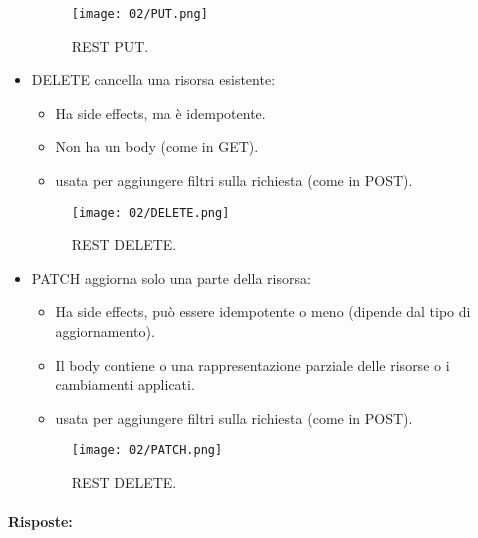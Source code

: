 \begin{itemize}
\begin{itemize}
	      \end{itemize}

	      \begin{figure}[h]
		      \centering
		      \texttt{[image: 02/PUT.png]}
		      \caption{REST PUT.}
	      \end{figure}

	\item DELETE cancella una risorsa esistente:
	      \begin{itemize}
		      \item Ha side effects, ma è idempotente.
		      \item Non ha un body (come in GET).
		      \item {} usata per aggiungere filtri sulla richiesta (come in POST).

	      \end{itemize}
	      \begin{figure}[h]
		      \centering
		      \texttt{[image: 02/DELETE.png]}
		      \caption{REST DELETE.}
	      \end{figure}


	\item PATCH aggiorna solo una parte della risorsa:
	      \begin{itemize}
		      \item Ha side effects, può essere idempotente o meno (dipende dal tipo di aggiornamento).
		      \item Il body contiene o una rappresentazione parziale delle risorse o i cambiamenti applicati.
		      \item {} usata per aggiungere filtri sulla richiesta (come in POST).

	      \end{itemize}
	      \begin{figure}[h]
		      \centering
		      \texttt{[image: 02/PATCH.png]}
		      \caption{REST DELETE.}
	      \end{figure}
\end{itemize}


\paragraph{Risposte:}

